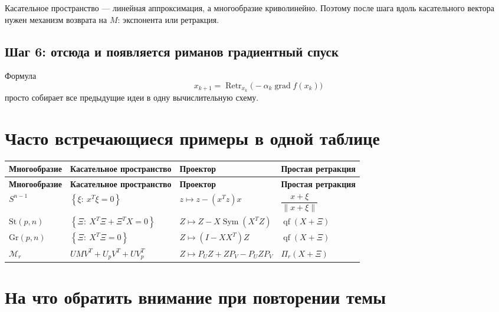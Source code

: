 \documentclass[12pt,a4paper]{article}
\theoremstyle{rudef}
\theoremstyle{ruplain}
\newcommand{\grad}{\operatorname{grad}}
\newcommand{\Sym}{\operatorname{Sym}}
\newcommand{\St}{\mathrm{St}}
\newcommand{\Gr}{\mathrm{Gr}}
\newcommand{\Retr}{\operatorname{Retr}}
\newcommand{\norm}[1]{\left\lVert #1\right\rVert}
\newcommand{\set}[1]{\left\{#1\right\}}
\begin{document}
Касательное пространство --- линейная аппроксимация, а многообразие криволинейно. Поэтому после шага вдоль касательного вектора нужен механизм возврата на $M$: экспонента или ретракция.

\subsection{Шаг 6: отсюда и появляется риманов градиентный спуск}

Формула
\[
x_{k+1}=\Retr_{x_k}\!\bigl(-\alpha_k\grad f(x_k)\bigr)
\]
просто собирает все предыдущие идеи в одну вычислительную схему.

\section{Часто встречающиеся примеры в одной таблице}

\renewcommand{\arraystretch}{1.28}
\begin{longtable}{>{\raggedright\arraybackslash}p{} >{\raggedright\arraybackslash}p{} >{\raggedright\arraybackslash}p{} >{\raggedright\arraybackslash}p{}}
\toprule
\textbf{Многообразие} & \textbf{Касательное пространство} & \textbf{Проектор} & \textbf{Простая ретракция} \\
\midrule
\endfirsthead
\toprule
\textbf{Многообразие} & \textbf{Касательное пространство} & \textbf{Проектор} & \textbf{Простая ретракция} \\
\midrule
\endhead
$S^{n-1}$ & $\set{\xi:\ x^T\xi=0}$ & $z\mapsto z-(x^Tz)x$ & $\dfrac{x+\xi}{\norm{x+\xi}}$ \\
\midrule
$\St(p,n)$ & $\set{\Xi:\ X^T\Xi+\Xi^TX=0}$ & $Z\mapsto Z-X\Sym(X^TZ)$ & $\operatorname{qf}(X+\Xi)$ \\
\midrule
$\Gr(p,n)$ & $\set{\Xi:\ X^T\Xi=0}$ & $Z\mapsto (I-XX^T)Z$ & $\operatorname{qf}(X+\Xi)$ \\
\midrule
$\mathcal M_r$ & $UMV^T+U_pV^T+UV_p^T$ & $Z\mapsto P_UZ+ZP_V-P_UZP_V$ & $\Pi_r(X+\Xi)$ \\
\bottomrule
\end{longtable}

\section{На что обратить внимание при повторении темы}
\end{document}
